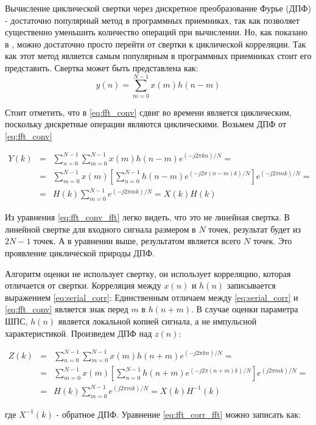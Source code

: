 
Вычисление циклической свертки через дискретное преобразование Фурье (ДПФ) - достаточно популярный метод
в программных приемниках, так как позволяет существенно уменьшить количество операций при вычислении. Но, как показано
в \cite{tsui, oppenheim}, можно достаточно просто перейти от свертки к циклической корреляции. Так как этот метод является самым
популярным в программных приемниках стоит его представить.
Свертка может быть представлена как:
\begin{equation}
	\label{eq:fft_conv}
	y(n)=\sum\limits_{m=0}^{N-1}{x(m)h(n-m)}
\end{equation}

Стоит отметить, что в \ref{eq:fft_conv} сдвиг во времени является циклическим, поскольку дискретные операции являются циклическими.
Возьмем ДПФ от \ref{eq:fft_conv}
\begin{center}
\begin{eqnarray}
	\label{eq:fft_conv_fft}
	Y(k) & = & \sum\limits_{n=0}^{N-1}\sum\limits_{m=0}^{N-1}{x(m)h(n-m)e^{(-j2\pi{kn})/N}}=\nonumber \\
	& = & \sum\limits_{m=0}^{N-1}{x(m)}[\sum\limits_{n=0}^{N-1}h(n-m)e^{(-j2\pi{(n-m)}k)/N}]e^{(-j2\pi{m}k)/N}=\\
	& = & H(k)\sum\limits_{m=0}^{N-1}e^{(-j2\pi{m}k)/N} = X(k)H(k)\nonumber 
\end{eqnarray}
\end{center}
Из уравнения \ref{eq:fft_conv_fft} легко видеть, что это не линейная свертка. В линейной свертке для входного сигнала размером в ${N}$ точек,
результат будет из ${2N-1}$ точек. А в уравнении выше, результатом является всего ${N}$ точек.
Это проявление циклической природы ДПФ.

Алгоритм оценки не использует свертку, он использует корреляцию, которая отличается от свертки. Корреляция
между $x(n)$ и $h(n)$ записывается выражением \ref{eq:serial_corr}:
Единственным отличаем между \ref{eq:serial_corr} и \ref{eq:fft_conv} является знак перед $m$ в ${h(n+m)}$.
В случае оценки параметра ШПС, $h(n)$ является локальной копией сигнала, а не импульсной характеристикой.
Произведем ДПФ над $z(n)$:
\begin{center}
\begin{eqnarray}
	\label{eq:fft_corr_fft}
	Z(k) & = & \sum\limits_{n=0}^{N-1}\sum\limits_{m=0}^{N-1}{x(m)h(n+m)e^{(-j2\pi{kn})/N}}=\nonumber \\
	& = & \sum\limits_{m=0}^{N-1}{x(m)}[\sum\limits_{n=0}^{N-1}h(n+m)e^{(-j2\pi{(n+m)}k)/N}]e^{(j2\pi{m}k)/N}=\\
	& = & H(k)\sum\limits_{m=0}^{N-1}e^{(j2\pi{m}k)/N} = X(k)H^{-1}(k)\nonumber 
\end{eqnarray}
\end{center}
где ${X^{-1}(k)}$ - обратное ДПФ. Уравнение \ref{eq:fft_corr_fft} можно записать как:

